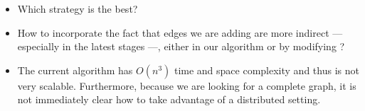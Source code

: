 \begin{itemize}
	\item Which strategy is the best?
	\item How to incorporate the fact that edges we are adding are more
		indirect --- especially in the latest stages ---, either in our
		algorithm or by modifying \ccp{}?
	\item The current algorithm has $O(n^3)$ time and space complexity and
		thus is not very scalable. Furthermore, because we are looking for a
		complete graph, it is not immediately clear how to take advantage of a
		distributed setting.
\end{itemize}

